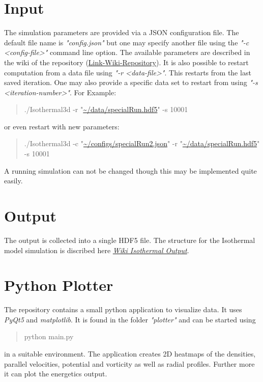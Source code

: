 \section{Input}
The simulation parameters are provided via a \ac{JSON} configuration file. The default file name is \textit{"config.json"} but one may specify another file using the \textit{"-c <config-file>"} command line option. The available parameters are described in the wiki of the repository (\href{https://git.uibk.ac.at/csat8630/t3g-cmake/wikis/parameters}{Link-Wiki-Repository}). It is also possible to restart computation from a data file using \textit{"-r <data-file>"}. This restarts from the last saved iteration. One may also provide a specific data set to restart from using \textit{"-s <iteration-number>"}. For Example:
\begin{quote}
    \small
./Isothermal3d -r "\url{~/data/specialRun.hdf5}" -s 10001
\end{quote}
or even restart with new parameters:
\begin{quote}
\small
      ./Isothermal3d -c "\url{~/configs/specialRun2.json}" -r "\url{~/data/specialRun.hdf5}" -s 10001  
\end{quote}
A running simulation can not be changed though this may be implemented quite easily.

\section{Output}
\label{sec:output}
The output is collected into a single \ac{HDF5} file. The structure for the Isothermal model simulation is discribed here \textit{\href{https://git.uibk.ac.at/csat8630/t3g-cmake/wikis/Isothermal/Output}{Wiki Isothermal Output}}.

\section{Python Plotter}
The repository contains a small python application to visualize data. It uses \textit{PyQt5} and \textit{matplotlib}. It is found in the folder \textit{"plotter"} and can be started using
\begin{quote}
    python main.py
\end{quote}
in a suitable environment. The application creates 2D heatmaps of the densities, parallel velocities, potential and vorticity as well as radial profiles. Further more it can plot the energetics output.
